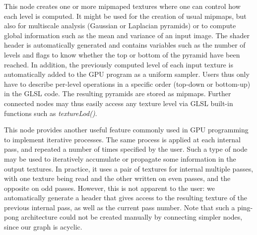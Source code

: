 \vspace{0.5cm}
%
This node creates one or more mipmaped textures where one can control
how each level is computed.  It might be used for the creation of
usual mipmaps, but also for multiscale analysis (Gaussian or Laplacian
pyramids) or to compute global information such as the mean and
variance of an input image.  The shader header is automatically
generated and contains variables such as the number of levels and
flags to know whether the top or bottom of the pyramid have been
reached.  In addition, the previously computed level of each input
texture is automatically added to the GPU program as a uniform
sampler.  Users thus only have to describe per-level operations in a
specific order (top-down or bottom-up) in the GLSL code.  The
resulting pyramids are stored as mipmaps.  Further connected nodes may
thus easily access any texture level via GLSL built-in functions such
as \textit{textureLod()}.

\vspace{0.5cm}
%
This node provides another useful feature commonly used in GPU
programming to implement iterative processes.  The same process is
applied at each internal pass, and repeated a number of times
specified by the user.  Such a type of node may be used to iteratively
accumulate or propagate some information in the output textures.  In
practice, it uses a pair of textures for internal multiple passes,
with one texture being read and the other written on even passes, and
the opposite on odd passes.  However, this is not apparent to the
user: we automatically generate a header that gives access to the
resulting texture of the previous internal pass, as well as the
current pass number.  Note that such a ping-pong architecture could
not be created manually by connecting simpler nodes, since our graph
is acyclic.


